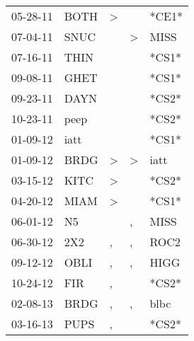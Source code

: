 \begin{supertabular}{p{0.07\textwidth}p{0.06\textwidth}p{0.02\textwidth}p{0.02\textwidth}p{0.06\textwidth}}
 05-28-11\textsuperscript{} &  BOTH\textsuperscript{} &  \textgreater &               &                   *CE1* \\
 07-04-11\textsuperscript{} &  SNUC\textsuperscript{} &               &  \textgreater &  MISS\textsuperscript{} \\
 07-16-11\textsuperscript{} &  THIN\textsuperscript{} &               &               &                   *CS1* \\
 09-08-11\textsuperscript{} &  GHET\textsuperscript{} &               &               &                   *CS1* \\
 09-23-11\textsuperscript{} &  DAYN\textsuperscript{} &               &               &                   *CS2* \\
 10-23-11\textsuperscript{} &  peep\textsuperscript{} &               &               &                   *CS2* \\
 01-09-12\textsuperscript{} &  iatt\textsuperscript{} &               &               &                   *CS1* \\
 01-09-12\textsuperscript{} &  BRDG\textsuperscript{} &  \textgreater &  \textgreater &  iatt\textsuperscript{} \\
 03-15-12\textsuperscript{} &  KITC\textsuperscript{} &  \textgreater &               &                   *CS2* \\
 04-20-12\textsuperscript{} &  MIAM\textsuperscript{} &  \textgreater &               &                   *CS1* \\
 06-01-12\textsuperscript{} &    N5\textsuperscript{} &               &             , &  MISS\textsuperscript{} \\
 06-30-12\textsuperscript{} &   2X2\textsuperscript{} &             , &             , &  ROC2\textsuperscript{} \\
 09-12-12\textsuperscript{} &  OBLI\textsuperscript{} &             , &             , &  HIGG\textsuperscript{} \\
 10-24-12\textsuperscript{} &   FIR\textsuperscript{} &             , &               &                   *CS2* \\
 02-08-13\textsuperscript{} &  BRDG\textsuperscript{} &             , &             , &  blbc\textsuperscript{} \\
 03-16-13\textsuperscript{} &  PUPS\textsuperscript{} &             , &               &                   *CS2* \\

\end{supertabular}
